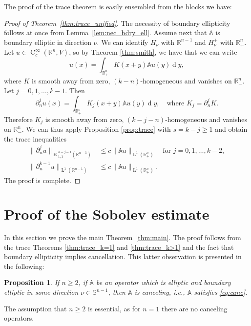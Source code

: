 \documentclass[a4paper,10pt]{amsart}
\newcommand{\R}{\mathbb R}
\renewcommand{\leq}{\leqslant}
\newcommand{\dif}{\mathrm{d}}
\renewcommand{\dif}{\operatorname{d}\!}
\newcommand{\lebe}{\operatorname{L}}
\newcommand{\hold}{\operatorname{C}}
\newcommand{\A}{\mathbb{A}}
\newcommand{\besov}{\operatorname{B}}
\numberwithin{equation}{section}
\newtheorem{proposition}[theorem]{Proposition}
\theoremstyle{remark}
\numberwithin{equation}{section}
\begin{document}
	The proof of the trace theorem is  easily ensembled from the blocks we have:
	\begin{proof}[Proof of Theorem~\ref{thm:trace_unified}]
		The necessity of boundary ellipticity follows at once from Lemma~\ref{lem:nec_bdry_ell}. Assume next that $\A$ is boundary elliptic in direction $\nu$. We can identify $H_\nu$ with $\R^{n-1}$ and $H_\nu^+$ with $\R^n_+$. Let $u\in\hold^\infty_c(\R^n,V)$, so by Theorem \ref{thm:smith}, we have that we can write
		$$
		u(x)=\int_{\R^n_+} K(x+y)\A u(y)\dif y,
		$$
		where $K$ is smooth away from zero, $(k-n)$-homogeneous and vanishes on $\R^n_-$. Let $j=0,1,\ldots, k-1$. Then
		$$
		\partial_n^j u(x)=\int_{\R^n_+} K_j(x+y)\A u(y)\dif y,\quad\text{where }K_j=\partial_n^j K.
		$$
		Therefore $K_j$ is smooth away from zero, $(k-j-n)$-homogeneous and vanishes on $\R^n_-$. We can thus apply Proposition \ref{prop:trace} with $s=k-j\geq 1$ and obtain the trace inequalities
		\begin{align*}
			\|\partial_n^j u\|_{{\dot{\besov}}{^{k-j-1}_{1,1}}(\R^{n-1})}&\leq c\|\A u\|_{\lebe^1(\R^n_+)}\quad\text{for }j=0,1,\ldots, k-2,\\
			\|\partial_n^{k-1} u\|_{\lebe^1(\R^{n-1})}&\leq c\|\A u\|_{\lebe^1(\R^n_+)}.
		\end{align*}
		The proof is complete.
	\end{proof}
	
	
	
	
	
	\section{Proof of the Sobolev estimate}\label{sec:sob}
	In this section we prove the main Theorem~\ref{thm:main}. The proof follows from the trace Theorems \ref{thm:trace_k=1} and \ref{thm:trace_k>1} and the fact that boundary ellipticity implies cancellation. This latter observation is presented in the following:
	
	\begin{proposition}\label{prop:bc_ec}
		If \(n \ge 2\), if $\A$ be an operator which is elliptic and boundary elliptic in some direction $\nu\in\mathbb{S}^{n-1}$, then $\A$ is canceling, i.e., \(\A \) satisfies \eqref{eq:canc}.
	\end{proposition}
	
	The assumption that \(n \ge 2\) is essential, as for \(n = 1\) there are no canceling operators.
	
\end{document}
